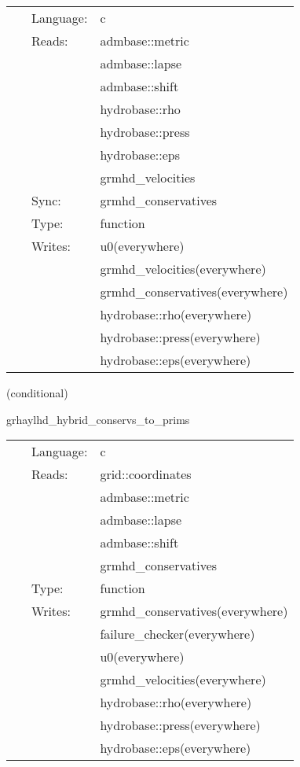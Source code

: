 \documentclass{article}
\begin{document}
\hspace{5mm}

 \begin{tabular*}{160mm}{cll} 
~ & Language:  & c \\ 
~ & Reads:  & admbase::metric \\ 
~& ~ &admbase::lapse\\ 
~& ~ &admbase::shift\\ 
~& ~ &hydrobase::rho\\ 
~& ~ &hydrobase::press\\ 
~& ~ &hydrobase::eps\\ 
~& ~ &grmhd\_velocities\\ 
~ & Sync:  & grmhd\_conservatives \\ 
~ & Type:  & function \\ 
~ & Writes:  & u0(everywhere) \\ 
~& ~ &grmhd\_velocities(everywhere)\\ 
~& ~ &grmhd\_conservatives(everywhere)\\ 
~& ~ &hydrobase::rho(everywhere)\\ 
~& ~ &hydrobase::press(everywhere)\\ 
~& ~ &hydrobase::eps(everywhere)\\ 
\end{tabular*} 


\vspace{5mm}

   (conditional) 

\hspace{5mm} grhaylhd\_hybrid\_conservs\_to\_prims 

\hspace{5mm}{\it hybrid version of grhaylhd\_conservs\_to\_prims } 


\hspace{5mm}

 \begin{tabular*}{160mm}{cll} 
~ & Language:  & c \\ 
~ & Reads:  & grid::coordinates \\ 
~& ~ &admbase::metric\\ 
~& ~ &admbase::lapse\\ 
~& ~ &admbase::shift\\ 
~& ~ &grmhd\_conservatives\\ 
~ & Type:  & function \\ 
~ & Writes:  & grmhd\_conservatives(everywhere) \\ 
~& ~ &failure\_checker(everywhere)\\ 
~& ~ &u0(everywhere)\\ 
~& ~ &grmhd\_velocities(everywhere)\\ 
~& ~ &hydrobase::rho(everywhere)\\ 
~& ~ &hydrobase::press(everywhere)\\ 
~& ~ &hydrobase::eps(everywhere)\\ 
\end{tabular*} 
\end{document}

